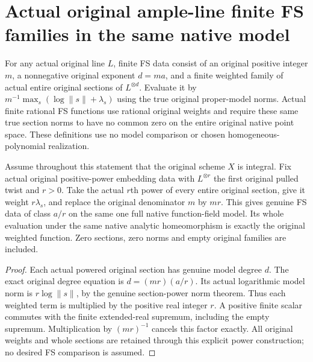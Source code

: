 \section{Actual original ample-line finite FS families in the same native model}
\label{sec:native-ample-model-fubini-study}

\begin{definition}
\label{def:native-line-whole-section-fs}
\leanok
{}
For any actual original line $L$, finite FS data consist of an original
positive integer $m$, a nonnegative original exponent $d=ma$, and a finite
weighted family of actual entire original sections of $L^{\otimes d}$.
Evaluate it by $m^{-1}\max_s(\log\lVert s\rVert+\lambda_s)$ using the true
original proper-model norms. Actual finite rational FS functions use rational
original weights and require these same true section norms to have no common
zero on the entire original native point space. These definitions use no model
comparison or chosen homogeneous-polynomial realization.
\end{definition}

\begin{theorem}
\label{thm:native-ample-model-fs-evaluation}
\leanok
{}
Assume throughout this statement that the original scheme $X$ is integral.
Fix actual original positive-power embedding data with $L^{\otimes r}$ the
first original pulled twist and $r>0$. Take the actual $r$th power of every
entire original section, give it weight $r\lambda_s$, and replace the original
denominator $m$ by $mr$. This gives genuine FS data of class $a/r$ on the same
one full native function-field model. Its whole evaluation under the same
native analytic homeomorphism is exactly the original weighted function.
Zero sections, zero norms and empty original families are included.
\end{theorem}
\begin{proof}
Each actual powered original section has genuine model degree $d$. The exact
original degree equation is $d=(mr)(a/r)$. Its actual logarithmic model norm
is $r\log\lVert s\rVert$, by the genuine section-power norm theorem. Thus each
weighted term is multiplied by the positive real integer $r$. A positive
finite scalar commutes with the finite extended-real supremum, including the
empty supremum. Multiplication by $(mr)^{-1}$ cancels this factor exactly.
All original weights and whole sections are retained through this explicit
power construction; no desired FS comparison is assumed.
\end{proof}

